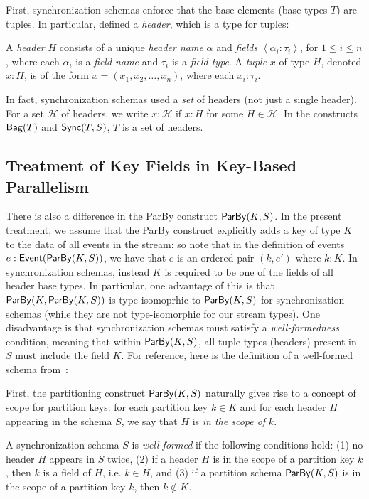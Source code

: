 First, synchronization schemas enforce that the base elements (base types $T$) are tuples.
In particular,  defined a \emph{header}, which is a type for tuples:
\begin{definition}
A \emph{header} $H$
consists of a unique \emph{header name} \(\alpha\)
and \emph{fields} \(\left\langle \alpha_i: \tau_i \right\rangle\), for $1\le i\le n$,
where each \(\alpha_i\) is a \emph{field name}
and \(\tau_i\) is a \emph{field type}.
A \emph{tuple} $x$ of type \(H\), denoted $x : H$, is of the form
\(x = (x_1, x_2, \ldots, x_n)\), where each \(x_i : \tau_i\).
\end{definition}

In fact, synchronization schemas used a \emph{set} of headers (not just a single header).
For a set $\mathcal{H}$ of headers, we write
$x: \mathcal{H}$ if $x : H$ for some $H \in \mathcal{H}$.
In the constructs $\mathsf{Bag}({T})$ and $\mathsf{Sync}({T}, S)$,
$T$ is a set of headers.

\subsection{Treatment of Key Fields in Key-Based Parallelism}

There is also a difference in the ParBy construct $\mathsf{ParBy}({K}, S)$.
In the present treatment, we assume that the ParBy construct explicitly adds a key of type $K$ to the data of all events in the stream: so note that in the definition of events $e: \mathsf{Event}({\mathsf{ParBy}({K}, S)})$, we have that $e$ is an ordered pair $(k, e')$
where $k: K$.
In synchronization schemas, instead $K$ is required to be one of the fields of all header base types.
In particular, one advantage of this is that $\mathsf{ParBy}({K}, \mathsf{ParBy}({K}, S))$ is type-isomoprhic to $\mathsf{ParBy}({K}, S)$ for synchronization schemas (while they are not type-isomorphic for our stream types).
One disadvantage is that synchronization schemas must satisfy a \emph{well-formedness} condition, meaning that within $\mathsf{ParBy}({K}, S)$, all tuple types (headers) present in $S$ must include the field $K$.
For reference, here is the definition of a well-formed schema from~:

\begin{definition}
\label{45:def:well-formed-sync-schema}
First, the partitioning construct $\mathsf{ParBy}({K}, S)$ naturally gives rise to a concept of
scope for partition keys: for each partition key $k \in K$ and for each
header $H$ appearing in the schema $S$,
we say that $H$ is \emph{in the scope of} $k$.

A synchronization schema $S$ is \emph{well-formed} if the following conditions hold: (1) no header $H$ appears in $S$ twice,
    (2) if a header $H$ is in the scope of a partition key $k$, then $k$ is a field of $H$, i.e. $k \in H$, and
    (3) if a partition schema $\mathsf{ParBy}({K}, S)$ is in the scope of a partition key $k$, then $k \not \in K$.
\end{definition}


